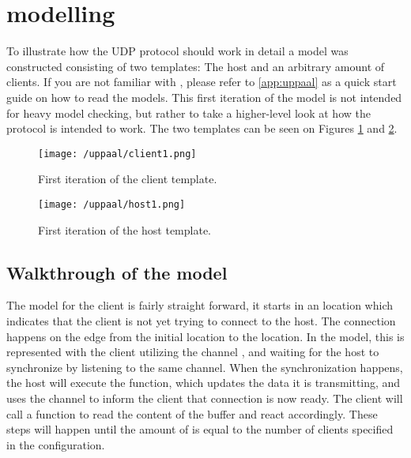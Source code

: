 \section{\uppaal modelling}\label{sec:sprint3-uppaal}
To illustrate how the UDP protocol should work in detail a \uppaal model was constructed consisting of two templates: The host and an arbitrary amount of clients.
If you are not familiar with \uppaal, please refer to \autoref{app:uppaal} as a quick start guide on how to read the models.
This first iteration of the model is not intended for heavy model checking, but rather to take a higher-level look at how the protocol is intended to work.
The two templates can be seen on Figures \ref{fig:uppaal-client-1} and \ref{fig:uppaal-host-1}.

\begin{figure}[H]
    \centering
    \texttt{[image: /uppaal/client1.png]}
    \caption{First iteration of the \uppaal client template.}
    \label{fig:uppaal-client-1}
\end{figure}

\begin{figure}[H]
    \centering
    \texttt{[image: /uppaal/host1.png]}
    \caption{First iteration of the \uppaal host template.}
    \label{fig:uppaal-host-1}
\end{figure}

\subsection{Walkthrough of the model}
The model for the client is fairly straight forward, it starts in an  location which indicates that the client is not yet trying to connect to the host.
The connection happens on the edge from the initial location to the  location.
In the model, this is represented with the client utilizing the channel , and waiting for the host to synchronize by listening to the same channel.
When the synchronization happens, the host will execute the  function, which updates the data it is transmitting, and uses the channel  to inform the client that connection is now ready.
The client will call a function  to read the content of the buffer and react accordingly.
These steps will happen until the amount of  is equal to the number of clients specified in the configuration.

